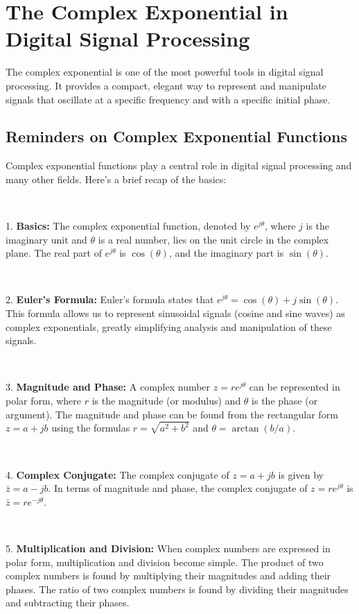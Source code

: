 \documentclass[11pt]{article}
\begin{document}
\section*{The Complex Exponential in Digital Signal Processing}

The complex exponential is one of the most powerful tools in digital signal processing. It provides a compact, elegant way to represent and manipulate signals that oscillate at a specific frequency and with a specific initial phase.


\subsection*{Reminders on Complex Exponential Functions}

Complex exponential functions play a central role in digital signal processing and many other fields. Here's a brief recap of the basics:

\ 


1. \textbf{Basics:} The complex exponential function, denoted by $e^{j\theta}$, where $j$ is the imaginary unit and $\theta$ is a real number, lies on the unit circle in the complex plane. The real part of $e^{j\theta}$ is $\cos(\theta)$, and the imaginary part is $\sin(\theta)$.

\ 


2. \textbf{Euler's Formula:} Euler's formula states that $e^{j\theta} = \cos(\theta) + j\sin(\theta)$. This formula allows us to represent sinusoidal signals (cosine and sine waves) as complex exponentials, greatly simplifying analysis and manipulation of these signals.

\ 


3. \textbf{Magnitude and Phase:} A complex number $z = r e^{j\theta}$ can be represented in polar form, where $r$ is the magnitude (or modulus) and $\theta$ is the phase (or argument). The magnitude and phase can be found from the rectangular form $z = a + jb$ using the formulas $r = \sqrt{a^2 + b^2}$ and $\theta = \arctan(b/a)$.

\ 


4. \textbf{Complex Conjugate:} The complex conjugate of $z = a + jb$ is given by $\bar{z} = a - jb$. In terms of magnitude and phase, the complex conjugate of $z = r e^{j\theta}$ is $\bar{z} = r e^{-j\theta}$.

\ 


5. \textbf{Multiplication and Division:} When complex numbers are expressed in polar form, multiplication and division become simple. The product of two complex numbers is found by multiplying their magnitudes and adding their phases. The ratio of two complex numbers is found by dividing their magnitudes and subtracting their phases.
\end{document}
